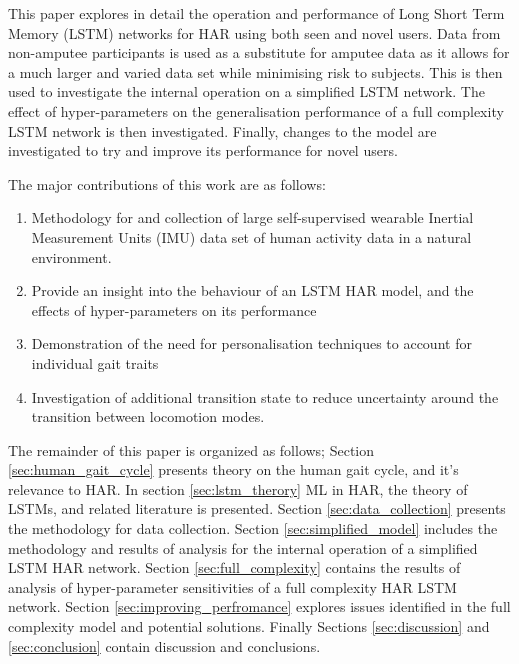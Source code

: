 \documentclass[sensors,article,submit,moreauthors,pdftex]{Definitions/mdpi}
\begin{document}
This paper explores in detail the operation and performance of Long Short Term Memory (LSTM) networks for HAR using both seen and novel users. Data from non-amputee participants is used as a substitute for amputee data as it allows for a much larger and varied data set while minimising risk to subjects. This is then used to investigate the internal operation on a simplified LSTM network. The effect of hyper-parameters on the generalisation performance of a full complexity LSTM network is then investigated. Finally, changes to the model are investigated to try and improve its performance for novel users. 

The major contributions of this work are as follows:

\begin{enumerate}
\item Methodology for and collection of large self-supervised wearable Inertial Measurement Units (IMU) data set of human activity data in a natural environment.
\item Provide an insight into the behaviour of an LSTM HAR model, and the effects of hyper-parameters on its performance
\item Demonstration of the need for personalisation techniques to account for individual gait traits
\item Investigation of additional transition state to reduce uncertainty around the transition between locomotion modes.
\end{enumerate}

The remainder of this paper is organized as follows; Section \ref{sec:human_gait_cycle} presents theory on the human gait cycle, and it's relevance to HAR. In section \ref{sec:lstm_therory} ML in HAR, the theory of LSTMs, and related literature is presented. Section \ref{sec:data_collection} presents the methodology for data collection. Section \ref{sec:simplified_model} includes the methodology and results of analysis for the internal operation of a simplified LSTM HAR network. Section \ref{sec:full_complexity} contains the results of analysis of hyper-parameter sensitivities of a full complexity HAR LSTM network. Section \ref{sec:improving_perfromance} explores issues identified in the full complexity model and potential solutions. Finally Sections \ref{sec:discussion} and \ref{sec:conclusion} contain discussion and conclusions.
\end{document}
